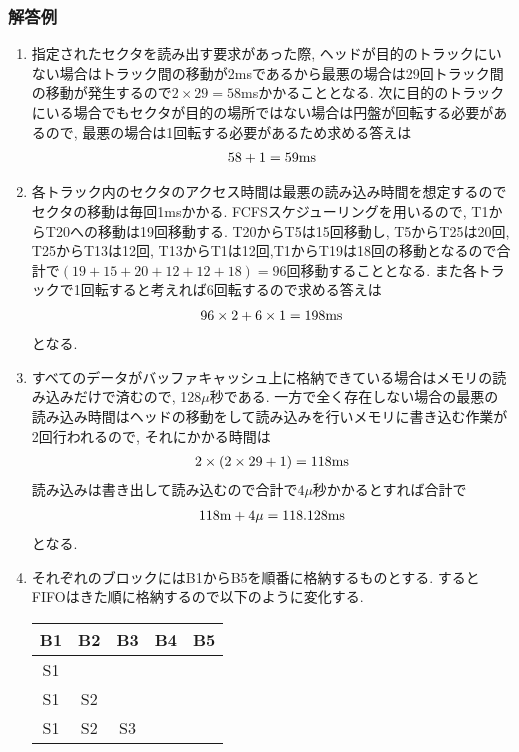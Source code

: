 \documentclass[dvipdfmx,titlepage, 11pt, a4paper]{jsarticle}%
\begin{document}
\subsubsection{解答例}
\begin{enumerate}[(1)]
  \setlength{\itemsep}{15pt}
\item 指定されたセクタを読み出す要求があった際, ヘッドが目的のトラックにいない場合はトラック間の移動が2msであるから最悪の場合は29回トラック間の移動が発生するので$2\times 29=58$msかかることとなる. 次に目的のトラックにいる場合でもセクタが目的の場所ではない場合は円盤が回転する必要があるので, 最悪の場合は1回転する必要があるため求める答えは
  \begin{eqnarray*}
    58+1=59{\rm ms}
  \end{eqnarray*}
\item 各トラック内のセクタのアクセス時間は最悪の読み込み時間を想定するのでセクタの移動は毎回1msかかる. FCFSスケジューリングを用いるので, T1からT20への移動は19回移動する. T20からT5は15回移動し, T5からT25は20回, T25からT13は12回, T13からT1は12回,T1からT19は18回の移動となるので合計で$(19+15+20+12+12+18)=96$回移動することとなる. また各トラックで1回転すると考えれば6回転するので求める答えは
  \begin{eqnarray*}
    96\times 2+6\times 1=198{\rm ms}
  \end{eqnarray*}
  となる.
\item すべてのデータがバッファキャッシュ上に格納できている場合はメモリの読み込みだけで済むので, 128$\mu$秒である. 一方で全く存在しない場合の最悪の読み込み時間はヘッドの移動をして読み込みを行いメモリに書き込む作業が2回行われるので, それにかかる時間は
  \begin{eqnarray*}
    2\times(2\times 29+1)=118{\rm ms}
  \end{eqnarray*}
  読み込みは書き出して読み込むので合計で$4\mu$秒かかるとすれば合計で
  \begin{eqnarray*}
    118{\rm m}+4\mu=118.128{\rm ms}
  \end{eqnarray*}
  となる. 
\item それぞれのブロックにはB1からB5を順番に格納するものとする. するとFIFOはきた順に格納するので以下のように変化する.
  \begin{center}
    \begin{tabular}{|c|c|c|c|c|} \hline
      B1&B2&B3&B4&B5\\ \hline\hline
      S1&&&& \\ \hline
      S1&S2&&& \\ \hline
      S1&S2&S3&& \\ \hline

\end{tabular}
\end{center}
\end{enumerate}
\end{document}
